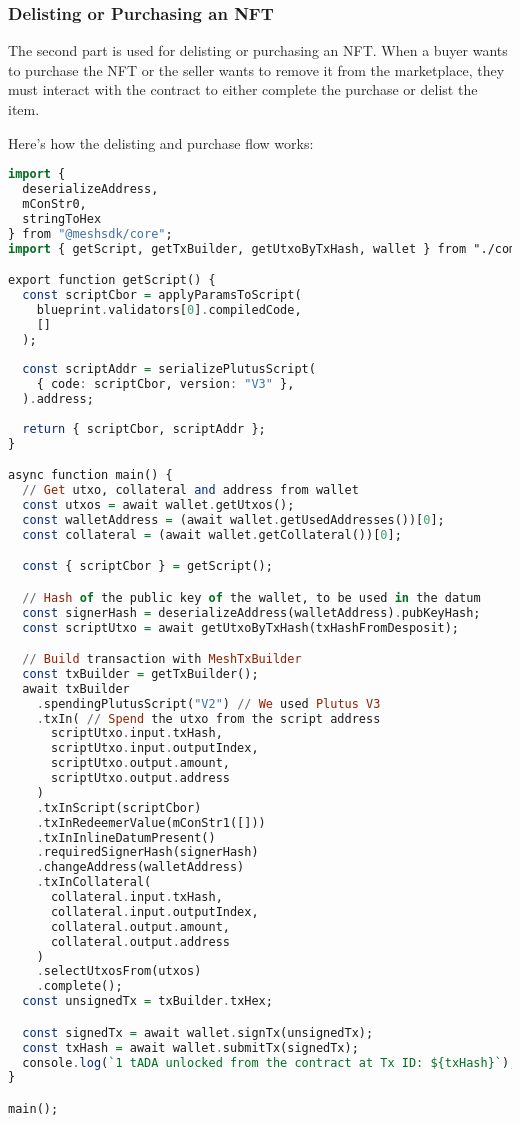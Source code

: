 \subsubsection{Delisting or Purchasing an NFT}

The second part is used for delisting or purchasing an NFT. When a buyer wants to purchase the NFT or the seller wants to remove it from the marketplace, they must interact with the contract to either complete the purchase or delist the item. 

Here’s how the delisting and purchase flow works:

\begin{lstlisting}[language=haskell, caption=Delisting or Purchasing an NFT using MeshJS]
import { 
  deserializeAddress, 
  mConStr0, 
  stringToHex 
} from "@meshsdk/core";
import { getScript, getTxBuilder, getUtxoByTxHash, wallet } from "./common";

export function getScript() {
  const scriptCbor = applyParamsToScript(
    blueprint.validators[0].compiledCode,
    []
  );
 
  const scriptAddr = serializePlutusScript(
    { code: scriptCbor, version: "V3" },
  ).address;
 
  return { scriptCbor, scriptAddr };
}

async function main() {
  // Get utxo, collateral and address from wallet
  const utxos = await wallet.getUtxos();
  const walletAddress = (await wallet.getUsedAddresses())[0];
  const collateral = (await wallet.getCollateral())[0];

  const { scriptCbor } = getScript();

  // Hash of the public key of the wallet, to be used in the datum
  const signerHash = deserializeAddress(walletAddress).pubKeyHash;
  const scriptUtxo = await getUtxoByTxHash(txHashFromDesposit);

  // Build transaction with MeshTxBuilder
  const txBuilder = getTxBuilder();
  await txBuilder
    .spendingPlutusScript("V2") // We used Plutus V3
    .txIn( // Spend the utxo from the script address
      scriptUtxo.input.txHash,
      scriptUtxo.input.outputIndex,
      scriptUtxo.output.amount,
      scriptUtxo.output.address
    )
    .txInScript(scriptCbor)
    .txInRedeemerValue(mConStr1([])) 
    .txInInlineDatumPresent()
    .requiredSignerHash(signerHash)
    .changeAddress(walletAddress)
    .txInCollateral(
      collateral.input.txHash,
      collateral.input.outputIndex,
      collateral.output.amount,
      collateral.output.address
    )
    .selectUtxosFrom(utxos)
    .complete();
  const unsignedTx = txBuilder.txHex;

  const signedTx = await wallet.signTx(unsignedTx);
  const txHash = await wallet.submitTx(signedTx);
  console.log(`1 tADA unlocked from the contract at Tx ID: ${txHash}`);
}

main();
\end{lstlisting}

